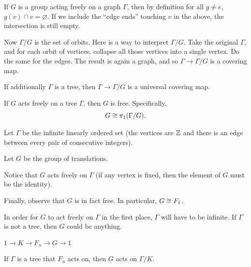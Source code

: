 \documentclass[11pt,leqno,oneside]{amsart}
\numberwithin{thm}{section}
\renewcommand{\null}{\varnothing}
\newcommand{\fund}[1][1]{\pi_{#1}}
\begin{document}
If $G$ is a group acting freely on a graph $\Gamma$, then by definition for all $g \neq e$, $g(v) \cap v = \null$.  If we include the ``edge ends'' touching $v$ in the above, the intersection is still empty.

Now $\Gamma/G$ is the set of orbits.  Here is a way to interpret $\Gamma/G$.  Take the original $\Gamma$, and for each orbit of vertices, collapse all those vertices into a single vertex.  Do the same for the edges.  The result is again a graph, and so $\Gamma \to \Gamma/G$ is a covering map.

If additionally $\Gamma$ is a tree, then $\Gamma \to \Gamma/G$ is a universal covering map.

\begin{thm}
  If $G$ acts freely on a tree $\Gamma$, then $G$ is free.  Specifically, $$G \isom \fund(\Gamma/G).$$
\end{thm}
\begin{example}
  Let $\Gamma$ be the infinite linearly ordered set (the vertices are ${\mathbb Z}$ and there is an edge between every pair of consecutive integers).

  Let $G$ be the group of translations.

  Notice that $G$ acts freely on $\Gamma$ (if any vertex is fixed, then the element of $G$ must be the identity).

  Finally, observe that $G$ is in fact free.  In particular, $G \mathrel{\cong} F_1$.
\end{example}
\begin{rmk}
  In order for $G$ to act freely on $\Gamma$ in the first place, $\Gamma$ will have to be infinite.  If $\Gamma$ is not a tree, then $G$ could be anything.
\end{rmk}

$1 \to K \to F_n \to G \to 1$

If $\Gamma$ is a tree that $F_n$ acts on, then $G$ acts on $\Gamma/K$.
\end{document}
